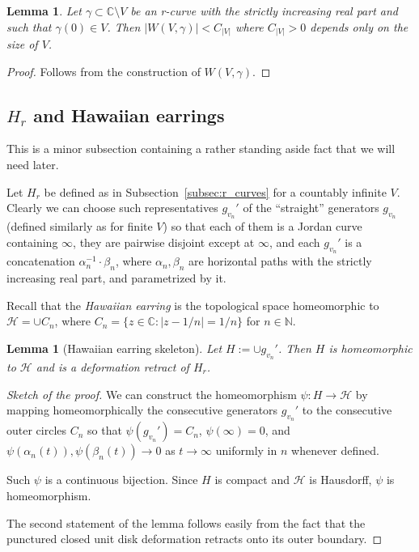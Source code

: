\documentclass[10pt,reqno,a4paper]{amsart}
\numberwithin{figure}{section}
\numberwithin{equation}{section}
\newtheorem{lmm}[thm]{Lemma}
\newcommand{\abs}[1]{\lvert #1 \rvert}
\begin{document}
\begin{lmm}
	Let $\gamma\subset \mathbb{C}\setminus V$ be an r-curve with the strictly increasing real part and such that $\gamma(0)\in V$. Then $\abs{W(V,\gamma)}<C_{\abs{V}}$ where $C_{\abs{V}}>0$ depends only on the size of $V$. 
\end{lmm}
\begin{proof}
	Follows from the construction of $W(V,\gamma)$.
\end{proof}

\subsection{$H_r$ and Hawaiian earrings}

This is a minor subsection containing a rather standing aside fact that we will need later.

Let $H_r$ be defined as in Subsection~\ref{subsec:r_curves} for a countably infinite $V$. Clearly we can choose such representatives $g_{v_n}'$ of the ``straight'' generators $g_{v_n}$ (defined similarly as for finite $V$) so that each of them is a Jordan curve containing $\infty$, they are pairwise disjoint except at $\infty$, and each $g_{v_n}'$ is a concatenation $\alpha_n^{-1}\cdot\beta_n$, where $\alpha_n,\beta_n$ are horizontal paths with the strictly increasing real part, and parametrized by it.

Recall that the \emph{Hawaiian earring} is the topological space homeomorphic to $\mathcal{H}=\cup C_n$, where $C_n=\{z\in\mathbb{C}: \abs{z-1/n}=1/n\}$ for $n\in\mathbb{N}$.

\begin{lmm}[Hawaiian earring skeleton]
	\label{lmm:hawaiian_earring_skeleton}
	Let $H:=\cup g_{v_n}'$. Then $H$ is homeomorphic to $\mathcal{H}$ and is a deformation retract of $H_r$.
\end{lmm}
\begin{proof}[Sketch of the proof]
	We can construct the homeomorphism $\psi:H\to\mathcal{H}$ by mapping homeomorphically the consecutive generators $g_{v_n}'$ to the consecutive outer circles $C_n$ so that $\psi(g_{v_n}')=C_n$, $\psi(\infty)=0$, and $\psi(\alpha_n(t)),\psi(\beta_n(t))\to 0$ as $t\to\infty$ uniformly in $n$ whenever defined.
	
	Such $\psi$ is a continuous bijection. Since $H$ is compact and $\mathcal{H}$ is Hausdorff, $\psi$ is homeomorphism.
	
	The second statement of the lemma follows easily from the fact that the punctured closed unit disk deformation retracts onto its outer boundary.
\end{proof}	
\end{document}
